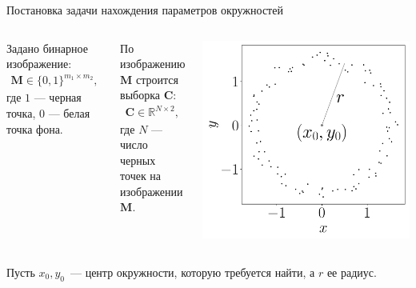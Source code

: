 \documentclass[10pt,pdf,hyperref={unicode}]{beamer}
\begin{document}
\begin{frame}[shrink=5]{Постановка задачи нахождения параметров окружностей}
\justifying
\begin{columns}
Задано бинарное изображение:
\begin{equation*}
\begin{aligned}
\textbf{M} \in \{0,1\}^{m_1 \times m_2},
\end{aligned}
\end{equation*}
где $1$ --- черная точка, $0$ --- белая точка фона.

По изображению $\textbf{M}$ строится выборка $\textbf{C}$:
\begin{equation*}
\begin{aligned}
\textbf{C} \in  \mathbb{R}^{N \times 2},
\end{aligned}
\end{equation*}
где $N$ --- число черных точек на изображении $\textbf{M}$.
\begin{center}
	\includegraphics[height=0.4\textheight]{figures/slides_statment}
\end{center}
\end{columns}


Пусть $x_0, y_0$~--- центр окружности, которую требуется найти, а $r$ ее радиус.


\end{frame}
\end{document}
